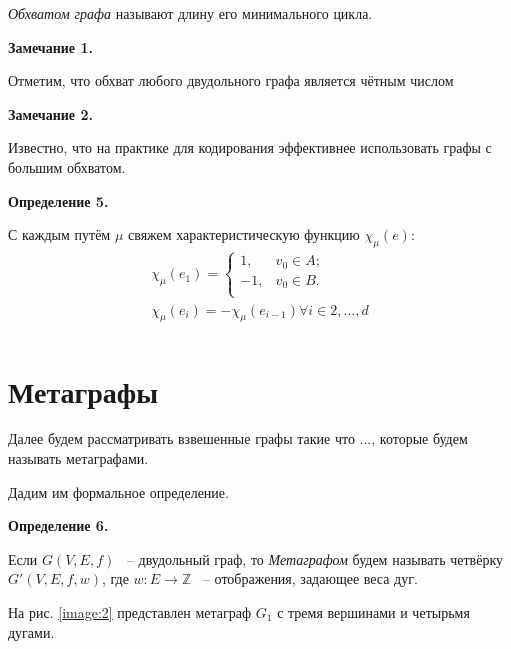\documentclass[14pt]{mmcs-article}
\begin{document}
\textsl{Обхватом графа} называют длину его минимального цикла.

\textbf{Замечание 1.}

Отметим, что обхват любого двудольного графа является чётным числом


\textbf{Замечание 2.}

Известно, что на практике для кодирования эффективнее использовать графы с большим обхватом.

\textbf{Определение 5.}


С каждым путём $\mu$ свяжем характеристическую функцию $\chi_\mu(e)$:
\[
    \begin{array}{ll}
        \chi_{\mu}(e_1) = \left\{
            \begin{array}{ll}
            1,  & v_0 \in A;\\
            -1, & v_0 \in B. \\
            \end{array}
        \right. \\
        \chi_\mu(e_i) = -\chi_\mu(e_{i-1}) \forall i \in 2, ..., d\\
    \end{array}
\]

\section{Метаграфы}

Далее будем рассматривать взвешенные графы такие что ..., которые будем называть метаграфами.

Дадим им формальное определение.

\textbf{Определение 6.}

Если $G(V,E,f)$ ~-- двудольный граф, то \textsl{Метаграфом} будем называть четвёрку $G'(V,E,f,w)$, где $w: E \to \mathbb{Z}$ ~-- отображения, задающее веса дуг.

На рис. \ref{image:2} представлен метаграф  $G_1$ с тремя вершинами и четырьмя дугами.
\end{document}
